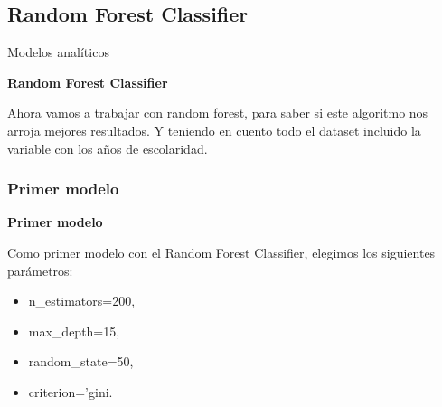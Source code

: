 \documentclass[pdf]{beamer}
\begin{document}
    \subsection{Random Forest Classifier}

\begin{frame}{Modelos analíticos}

    
    \begin{Large}
        \textbf{Random Forest Classifier}
    \end{Large}

    Ahora vamos a trabajar con random forest, para saber si este algoritmo nos arroja mejores resultados. Y teniendo en cuento todo el dataset incluido la variable con los años de escolaridad. 

    \subsubsection{Primer modelo}
    \begin{Large}
        \textbf{Primer modelo}
    \end{Large}

    Como primer modelo con el Random Forest Classifier, elegimos los siguientes parámetros:
    \begin{itemize}
        \item n\_estimators=200,
        \item max\_depth=15,
        \item random\_state=50,
        \item criterion='gini.
    \end{itemize}

\end{frame}
\end{document}

